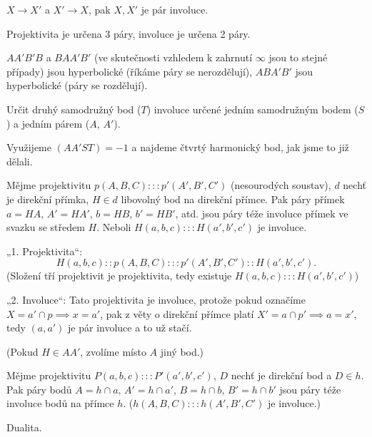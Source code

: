 \documentclass[12pt]{article}					%
\begin{document}

\begin{poznamka}
	$X \rightarrow X'$ a $X' \rightarrow X$, pak $X, X'$ je pár involuce.
\end{poznamka}

\begin{poznamka}
	Projektivita je určena 3 páry, involuce je určena 2 páry.
\end{poznamka}

\begin{dusledek}
	$A A' B' B$ a $B A A' B'$ (ve skutečnosti vzhledem k zahrnutí $∞$ jsou to stejné případy) jsou hyperbolické (říkáme páry se nerozdělují), $A B A' B'$ jsou hyperbolické (páry se rozdělují).
\end{dusledek}

\begin{priklad}[Konstrukce]
	Určit druhý samodružný bod ($T$) involuce určené jedním samodružným bodem ($S$) a jedním párem ($A$, $A'$).

	\begin{reseni}
		Využijeme $(AA'ST) = -1$ a najdeme čtvrtý harmonický bod, jak jsme to již dělali.
	\end{reseni}
\end{priklad}

\begin{veta}
	Mějme projektivitu $p(A, B, C) ::: p'(A', B', C')$ (nesourodých soustav), $d$ nechť je direkční přímka, $H \in d$ libovolný bod na direkční přímce. Pak páry přímek $a = HA$, $A' = HA'$, $b = HB$, $b' = HB'$, atd. jsou páry téže involuce přímek ve svazku se středem $H$. Neboli $H(a, b, c) ::: H(a', b', c')$ je involuce.

	\begin{dukazin}
		„1. Projektivita“:
		$$ H(a, b, c) :: p(A, B, C) ::: p'(A', B', C') :: H(a', b', c'). $$
		(Složení tří projektivit je projektivita, tedy existuje $H(a, b, c) ::: H(a', b', c')$)

		„2. Involuce“: Tato projektivita je involuce, protože pokud označíme $X = a' \cap p \implies x = a'$, pak z věty o direkční přímce platí $X' = a \cap p' \implies a = x'$, tedy $(a, a')$ je pár involuce a to už stačí.

		(Pokud $H \in AA'$, zvolíme místo $A$ jiný bod.)
	\end{dukazin}
\end{veta}

\begin{veta}
	Mějme projektivitu $P(a, b, c) ::: P'(a', b', c')$, $D$ nechť je direkční bod a $D \in h$. Pak páry bodů $A = h \cap a$, $A' = h \cap a'$, $B = h \cap b$, $B' = h \cap b'$ jsou páry téže involuce bodů na přímce $h$. ($h(A, B, C) ::: h(A', B', C')$ je involuce.)

	\begin{dukazin}
		Dualita.
	\end{dukazin}
\end{veta}
\end{document}
